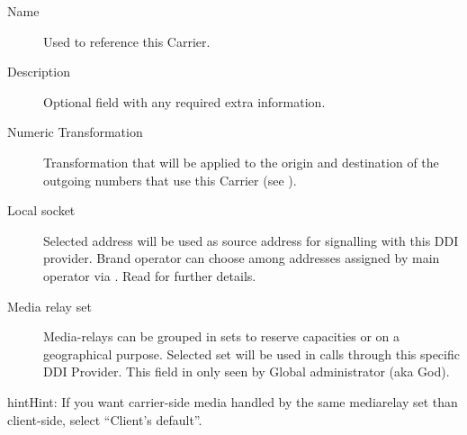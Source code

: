 \documentclass[letterpaper,10pt,english]{sphinxmanual}
\begin{document}
\begin{description}
\item[{Name}] \leavevmode{}\label{administration_portal/brand/providers/ddi_providers:term-name}
Used to reference this Carrier.

\item[{Description}] \leavevmode{}\label{administration_portal/brand/providers/ddi_providers:term-description}
Optional field with any required extra information.

\item[{Numeric Transformation}] \leavevmode{}\label{administration_portal/brand/providers/ddi_providers:term-numeric-transformation}
Transformation that will be applied to the origin and destination of the
outgoing numbers that use this Carrier
(see {\hyperref[administration_portal/brand/settings/numeric_transformations:numeric\string-transformations]{}}).

\item[{Local socket}] \leavevmode{}\label{administration_portal/brand/providers/ddi_providers:term-local-socket}
Selected address will be used as source address for signalling with this DDI provider. Brand operator can choose among
addresses assigned by main operator via {\hyperref[administration_portal/platform/brands:brands]{}}. Read {\hyperref[administration_portal/platform/infrastructure/proxy_trunks:proxy\string-trunks]{}} for further details.

\item[{Media relay set}] \leavevmode{}\label{administration_portal/brand/providers/ddi_providers:term-media-relay-set}
Media-relays can be grouped in sets to reserve capacities or on a geographical purpose. Selected set will be used
in calls through this specific DDI Provider. This field in only seen by Global administrator (aka God).

\end{description}

\begin{notice}{hint}{Hint:}
If you want carrier-side media handled by the same mediarelay set than client-side, select ``Client's default''.
\end{notice}
\end{document}
